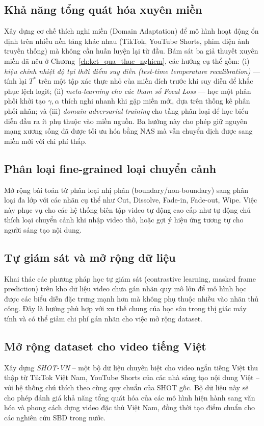\subsection{Khả năng tổng quát hóa xuyên miền}
Xây dựng cơ chế thích nghi miền (Domain Adaptation) để mô hình hoạt động ổn định trên nhiều nền tảng khác nhau (TikTok, YouTube Shorts, phim điện ảnh truyền thống) mà không cần huấn luyện lại từ đầu. Bám sát ba giả thuyết xuyên miền đã nêu ở Chương~\ref{ch:ket_qua_thuc_nghiem}, các hướng cụ thể gồm: (i) \textit{hiệu chỉnh nhiệt độ tại thời điểm suy diễn (test-time temperature recalibration)} --- tính lại $T^*$ trên một tập xác thực nhỏ của miền đích trước khi suy diễn để khắc phục lệch logit; (ii) \textit{meta-learning cho các tham số Focal Loss} --- học một phân phối khởi tạo $\gamma, \alpha$ thích nghi nhanh khi gặp miền mới, dựa trên thống kê phân phối nhãn; và (iii) \textit{domain-adversarial training} cho tầng phân loại để học biểu diễn đầu ra ít phụ thuộc vào miền nguồn. Ba hướng này cho phép giữ nguyên mạng xương sống đã được tối ưu hóa bằng NAS mà vẫn chuyển dịch được sang miền mới với chi phí thấp.

\subsection{Phân loại fine-grained loại chuyển cảnh}
Mở rộng bài toán từ phân loại nhị phân (boundary/non-boundary) sang phân loại đa lớp với các nhãn cụ thể như Cut, Dissolve, Fade-in, Fade-out, Wipe. Việc này phục vụ cho các hệ thống biên tập video tự động cao cấp như tự động chú thích loại chuyển cảnh khi nhập video thô, hoặc gợi ý hiệu ứng tương tự cho người sáng tạo nội dung.

\subsection{Tự giám sát và mở rộng dữ liệu}
Khai thác các phương pháp học tự giám sát (contrastive learning, masked frame prediction) trên kho dữ liệu video chưa gán nhãn quy mô lớn để mô hình học được các biểu diễn đặc trưng mạnh hơn mà không phụ thuộc nhiều vào nhãn thủ công. Đây là hướng phù hợp với xu thế chung của học sâu trong thị giác máy tính và có thể giảm chi phí gán nhãn cho việc mở rộng dataset.

\subsection{Mở rộng dataset cho video tiếng Việt}
Xây dựng \textit{SHOT-VN} -- một bộ dữ liệu chuyên biệt cho video ngắn tiếng Việt thu thập từ TikTok Việt Nam, YouTube Shorts của các nhà sáng tạo nội dung Việt -- với hệ thống chú thích theo cùng quy chuẩn của SHOT gốc. Bộ dữ liệu này sẽ cho phép đánh giá khả năng tổng quát hóa của các mô hình hiện hành sang văn hóa và phong cách dựng video đặc thù Việt Nam, đồng thời tạo điểm chuẩn cho các nghiên cứu SBD trong nước.

